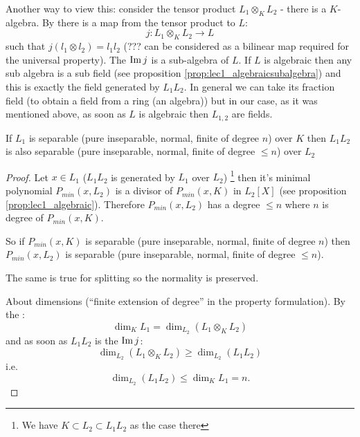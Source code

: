 Another way to view this: consider the tensor product $L_1 \otimes_K
L_2$ - there is a $K$-algebra. By 
there is a map from the tensor product to $L$:
\[
j: L_1 \otimes_K L_2 \to L  
\]
such that $j\left(l_1 \otimes l_2\right) = l_1 l_2$ (??? can be considered
as a bilinear map required for the universal property). The
 $\operatorname{Im} j$ is a sub-algebra of $L$. If $L$ is
algebraic then any sub algebra is a sub field (see proposition
\ref{prop:lec1_algebraicsubalgebra}) and this 
is exactly the field generated by $L_1 L_2$. In general we can take
its fraction field (to obtain a field from a ring (an algebra)) but in
our case, as it was mentioned above, as soon as $L$ is algebraic then
$L_{1,2}$ are fields.

\begin{property}
  If $L_1$ is separable (pure inseparable, normal, finite of
  degree $n$) over $K$ then $L_1 L_2$ is also separable (pure
  inseparable, normal, finite of degree $ \le n$) over $L_2$
  \begin{proof}
    Let $x \in L_1$ ($L_1 L_2$ is generated by $L_1$ over $L_2$)
    \footnote{
      We have $K \subset L_2 \subset L_1 L_2$ as the case there
    }
    then it's minimal polynomial $P_{min}\left(x, L_2\right)$ is a
    divisor of $P_{min}\left(x, K\right)$ in
    $L_2\left[X\right]$ (see proposition \ref{prop:lec1_algebraic}). 
    Therefore $P_{min}\left(x, L_2\right)$ has a
    degree $\le n$ where $n$ 
    is degree of $P_{min}\left(x, K\right)$.

    So if $P_{min}\left(x, K\right)$ is separable (pure inseparable,
    normal, finite of degree $n$)  then $P_{min}\left(x, L_2\right)$
    is separable (pure inseparable, normal, finite of degree $\le n$).

    The same is true for splitting so the normality is preserved.

    About dimensions (``finite extension of degree'' in the property
    formulation). By the :
    \[
    \dim_K L_1 = \dim_{L_2}\left(L_1 \otimes_K L_2\right)
    \]
    and as soon as $L_1 L_2$ is the $\operatorname{Im} j$:
    \[
    \dim_{L_2}\left(L_1 \otimes_K L_2\right) \ge
    \dim_{L_2}\left(L_1 L_2\right)
    \]
    i.e.
    \[
    \dim_{L_2}\left(L_1 L_2\right) \le \dim_K L_1 = n.
    \]
  \end{proof}
  \label{property:lec7_1}
\end{property}

